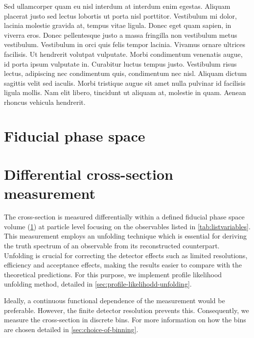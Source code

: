 Sed ullamcorper quam eu nisl interdum at interdum enim egestas. Aliquam placerat justo sed lectus lobortis ut porta nisl porttitor. Vestibulum mi dolor, lacinia molestie gravida at, tempus vitae ligula. Donec eget quam sapien, in viverra eros. Donec pellentesque justo a massa fringilla non vestibulum metus vestibulum. Vestibulum in orci quis felis tempor lacinia. Vivamus ornare ultrices facilisis. Ut hendrerit volutpat vulputate. Morbi condimentum venenatis augue, id porta ipsum vulputate in. Curabitur luctus tempus justo. Vestibulum risus lectus, adipiscing nec condimentum quis, condimentum nec nisl. Aliquam dictum sagittis velit sed iaculis. Morbi tristique augue sit amet nulla pulvinar id facilisis ligula mollis. Nam elit libero, tincidunt ut aliquam at, molestie in quam. Aenean rhoncus vehicula hendrerit.

\section{Fiducial phase space}
\label{sec:fiducial-phase-space}

\section{Differential cross-section measurement}
\label{sec:diff-xsec-measurement}
The cross-section is measured differentially within a defined fiducial phase space volume (\cref{sec:fiducial-phase-space}) at particle level focusing on the observables listed in \cref{tab:listvariables}. This measurement employs an unfolding technique which is essential for deriving the truth spectrum of an observable from its reconstructed counterpart. Unfolding is crucial for correcting the detector effects such as limited resolutions, efficiency and acceptance effects, making the results easier to compare with the theoretical predictions. For this purpose, we implement profile likelihood unfolding method, detailed in \cref{sec:profile-likelihodd-unfolding}. 

Ideally, a continuous functional dependence of the measurement would be preferable. However, the finite detector resolution prevents this. Consequently, we measure the cross-section in discrete bins. For more information on how the bins are chosen detailed in \cref{sec:choice-of-binning}.

